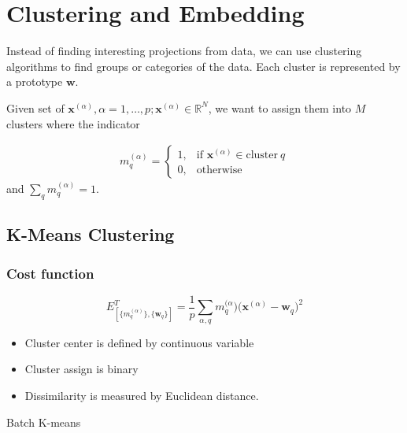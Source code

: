 \chapter{Clustering and Embedding}
Instead of finding interesting projections from data, we can use clustering algorithms to find groups or categories of the data. Each cluster is represented by a prototype $\boldsymbol{w}$.

Given set of $\boldsymbol{x}^{(\alpha)}, \alpha=1,\dots,p;  \boldsymbol{x}^{(\alpha)} \in \mathbb{R}^N$, we want to assign them into $M$ clusters where the indicator

\begin{align*}
	m_q^{(\alpha)} = \begin{cases}
    1,& \text{if } \boldsymbol{x}^{(\alpha)} \in \text{cluster} \ q\\
    0,              & \text{otherwise}
\end{cases}
\end{align*}
and $\sum_q m_q^{(\alpha)} = 1 $.

\section{K-Means Clustering}
\subsection{Cost function}
$$
E^T_{[ \{ m_q^{(\alpha)} \}, \{ \boldsymbol{w}_q \}]} = \frac{1}{p}\sum_{\alpha, q} m_q^{(\alpha})\bigg(  \boldsymbol{x}^{(\alpha)} - \boldsymbol{w}_q \bigg)^2
$$

\begin{itemize}
	\item Cluster center is defined by continuous variable
	\item Cluster assign is binary 
	\item Dissimilarity is measured by Euclidean distance.
\end{itemize}

\begin{algorithm}[H]
\caption{Batch K-means}
\end{algorithm}

